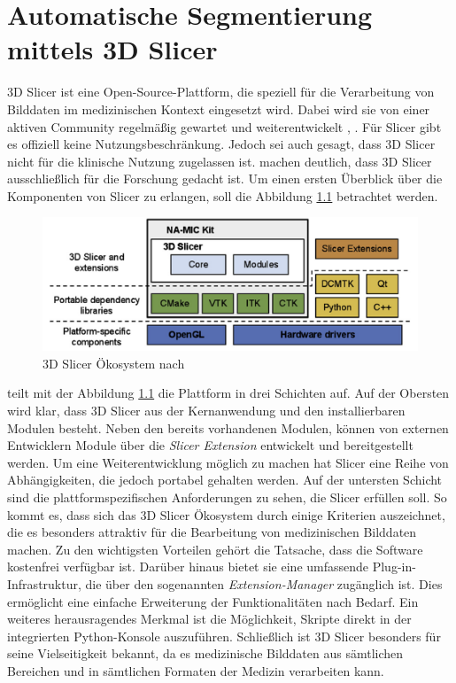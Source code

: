 \chapter{Automatische Segmentierung mittels 3D Slicer}
\label{sec:3d_slicer} 3D Slicer ist eine Open-Source-Plattform, die speziell für
die Verarbeitung von Bilddaten im medizinischen Kontext eingesetzt wird. Dabei wird
sie von einer aktiven Community regelmäßig gewartet und weiterentwickelt \citep[vgl.][]{slicer2024},
\citep[vgl.][S.~1325]{fedorov2012slicer}. Für Slicer gibt es offiziell keine Nutzungsbeschränkung.
Jedoch sei auch gesagt, dass 3D Slicer nicht für die klinische Nutzung zugelassen
ist. \citet[S.~1331]{fedorov2012slicer} machen deutlich, dass 3D Slicer
ausschließlich für die Forschung gedacht ist. Um einen ersten Überblick über die
Komponenten von Slicer zu erlangen, soll die Abbildung
\ref{fig:3d_slicer_oekosystem} betrachtet werden.

\begin{figure}[h]
	\centering
	\includegraphics[width=1\textwidth]{img/3d_slicer_overview.jpg}
	\caption{3D Slicer Ökosystem nach \citet[S.~1326]{fedorov2012slicer}}
	\label{fig:3d_slicer_oekosystem}
\end{figure}

\citet[S.~1326]{fedorov2012slicer} teilt mit der Abbildung
\ref{fig:3d_slicer_oekosystem} die Plattform in drei Schichten auf. Auf der Obersten
wird klar, dass 3D Slicer aus der Kernanwendung und den installierbaren Modulen
besteht. Neben den bereits vorhandenen Modulen, können von externen Entwicklern
Module über die \textit{Slicer Extension} entwickelt und bereitgestellt werden.
Um eine Weiterentwicklung möglich zu machen hat Slicer eine Reihe von
Abhängigkeiten, die jedoch portabel gehalten werden. Auf der untersten Schicht
sind die plattformspezifischen Anforderungen zu sehen, die Slicer erfüllen soll.
So kommt es, dass sich das 3D Slicer Ökosystem durch einige Kriterien auszeichnet,
die es besonders attraktiv für die Bearbeitung von medizinischen Bilddaten
machen. Zu den wichtigsten Vorteilen gehört die Tatsache, dass die Software
kostenfrei verfügbar ist. Darüber hinaus bietet sie eine umfassende Plug-in-Infrastruktur,
die über den sogenannten \textit{Extension-Manager} zugänglich ist. Dies
ermöglicht eine einfache Erweiterung der Funktionalitäten nach Bedarf. Ein weiteres
herausragendes Merkmal ist die Möglichkeit, Skripte direkt in der integrierten
Python-Konsole auszuführen. Schließlich ist 3D Slicer besonders für seine Vielseitigkeit
bekannt, da es medizinische Bilddaten aus sämtlichen Bereichen und in sämtlichen
Formaten der Medizin verarbeiten kann.

